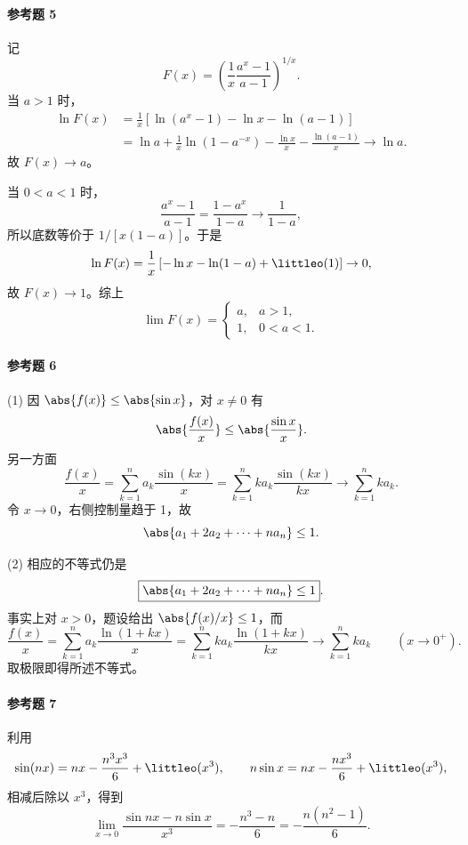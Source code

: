 \paragraph{参考题 5}
\begin{xsolution}
记
\[
  F(x)=\left(\frac1x\frac{a^x-1}{a-1}\right)^{1/x}.
\]
当 $a>1$ 时，
\begin{align*}
  \ln F(x)
  &=\frac1x\left[\ln(a^x-1)-\ln x-\ln(a-1)\right]\\
  &=\ln a+\frac1x\ln(1-a^{-x})
    -\frac{\ln x}{x}-\frac{\ln(a-1)}x\to\ln a.
\end{align*}
故 $F(x)\to a$。

当 $0<a<1$ 时，
\[
  \frac{a^x-1}{a-1}=\frac{1-a^x}{1-a}\to\frac1{1-a},
\]
所以底数等价于 $1/[x(1-a)]$。于是
\[
  \ln F(x)=\frac1x\left[-\ln x-\ln(1-a)+\littleo(1)\right]\to0,
\]
故 $F(x)\to1$。综上
\[
  \boxed{\lim F(x)=
  \begin{cases}
    a,&a>1,\\
    1,&0<a<1.
  \end{cases}}
\]
\end{xsolution}

\paragraph{参考题 6}
\begin{xsolution}
(1) 因 $\abs{f(x)}\leq\abs{\sin x}$，对 $x\ne0$ 有
\[
  \abs{\frac{f(x)}x}\leq\abs{\frac{\sin x}{x}}.
\]
另一方面
\[
  \frac{f(x)}x
  =\sum_{k=1}^n a_k\frac{\sin(kx)}x
  =\sum_{k=1}^n k a_k\frac{\sin(kx)}{kx}
  \to\sum_{k=1}^n k a_k.
\]
令 $x\to0$，右侧控制量趋于 1，故
\[
  \abs{a_1+2a_2+\cdots+na_n}\leq1.
\]

(2) 相应的不等式仍是
\[
  \boxed{\abs{a_1+2a_2+\cdots+na_n}\leq1}.
\]
事实上对 $x>0$，题设给出 $\abs{f(x)/x}\leq1$，而
\[
  \frac{f(x)}x
  =\sum_{k=1}^n a_k\frac{\ln(1+kx)}x
  =\sum_{k=1}^n k a_k\frac{\ln(1+kx)}{kx}
  \to\sum_{k=1}^n k a_k
  \qquad(x\to0^+).
\]
取极限即得所述不等式。
\end{xsolution}

\paragraph{参考题 7}
\begin{xsolution}
利用
\[
  \sin(nx)=nx-\frac{n^3x^3}{6}+\littleo(x^3),
  \qquad
  n\sin x=nx-\frac{nx^3}{6}+\littleo(x^3),
\]
相减后除以 $x^3$，得到
\[
  \lim_{x\to0}\frac{\sin nx-n\sin x}{x^3}
  =-\frac{n^3-n}{6}
  =-\frac{n(n^2-1)}6.
\]
\end{xsolution}

